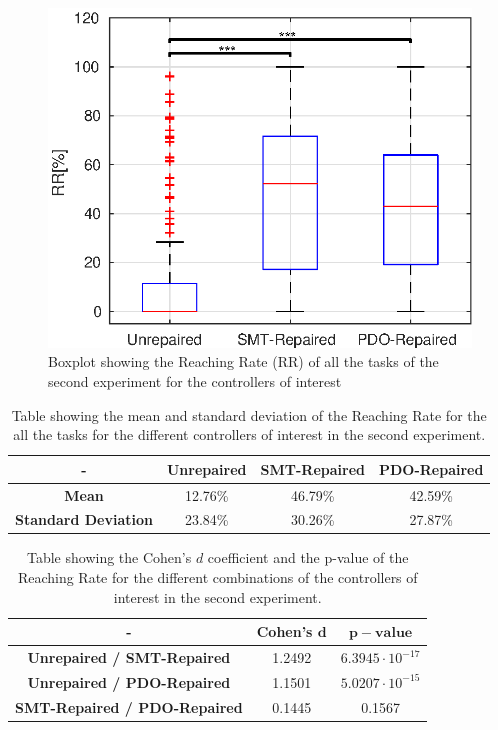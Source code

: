 \begin{figure}[H]
    \centering
    \includegraphics[width=\textwidth]{Images/second-experiment/exp1_RR_all_box.eps}
    \caption{Boxplot showing the Reaching Rate (RR) of all the tasks of the second experiment for the controllers of interest}
    \label{fig:box-RR-all-second}
\end{figure}
\begin{table}[H]
    \centering
    \begin{tabular}{|c|c|c|c|}
        \hline
        - & \textbf{Unrepaired} & \textbf{SMT-Repaired} & \textbf{PDO-Repaired} \\
        \hline
        \textbf{Mean} & 12.76\% & 46.79\% & 42.59\% \\
        \textbf{Standard Deviation} & 23.84\% & 30.26\% & 27.87\% \\
        \hline
    \end{tabular}
    \caption{Table showing the mean and standard deviation of the Reaching Rate for the all the tasks for the different controllers of interest in the second experiment.}
    \label{tab:RR-all-second-mean-std}
\end{table}
\begin{table}[H]
    \centering
    \begin{tabular}{|c|c|c|}
        \hline
        - & \textbf{Cohen's} $\mathbf{d}$ & $\mathbf{p-value}$ \\
        \hline
        \textbf{Unrepaired / SMT-Repaired} & 1.2492 & $6.3945 \cdot 10^{-17}$ \\
        \textbf{Unrepaired / PDO-Repaired} & 1.1501 & $5.0207 \cdot 10^{-15}$ \\
        \textbf{SMT-Repaired / PDO-Repaired} & 0.1445 & 0.1567 \\
        \hline
    \end{tabular}
    \caption{Table showing the Cohen's $d$ coefficient and the p-value of the Reaching Rate for the different combinations of the controllers of interest in the second experiment.}
    \label{tab:RR-all-second-cohen-p}
\end{table}
